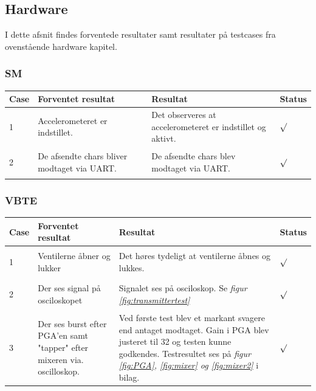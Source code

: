 \subsection{Hardware}
I dette afsnit findes forventede resultater samt resultater på testcases fra ovenstående hardware kapitel.\\
\subsubsection{SM}
\begin{table}[H]
\centering
\begin{tabular}{| p{1cm}  | p{4cm} | p{6cm} | p{1cm} |}
\hline
Case &Forventet resultat &Resultat &Status\\\hline
1 &Accelerometeret er indstillet. &Det observeres at accelerometeret er indstillet og aktivt. &\begin{Huge}$\surd$\end{Huge}\\\hline
2 &De afsendte chars bliver modtaget via UART. &De afsendte chars blev modtaget via UART. &\begin{Huge}$\surd$\end{Huge}\\\hline
\end{tabular}
\end{table}
\subsubsection{VBTE}
\begin{table}[H]
\centering
\begin{tabular}{| p{1cm}  | p{4cm} | p{6cm} | p{1cm} |}
\hline
Case &Forventet resultat &Resultat &Status\\\hline
1 &Ventilerne åbner og lukker &Det høres tydeligt at ventilerne åbnes og lukkes. &\begin{Huge}$\surd$\end{Huge} \\\hline 
2 &Der ses signal på osciloskopet &Signalet ses på osciloskop. Se \textit{figur \ref{fig:transmittertest}} &\begin{Huge}$\surd$\end{Huge} \\\hline 
3 & Der ses burst efter PGA'en samt "tapper" efter mixeren via. oscilloskop. & Ved første test blev et markant svagere end antaget modtaget. Gain i PGA blev justeret til 32 og testen kunne godkendes. Testresultet ses på \textit{figur \ref{fig:PGA}, \ref{fig:mixer} og \ref{fig:mixer2}} i bilag. &\begin{Huge}$\surd$\end{Huge} \\\hline 
\end{tabular}
\end{table}
\newpage
